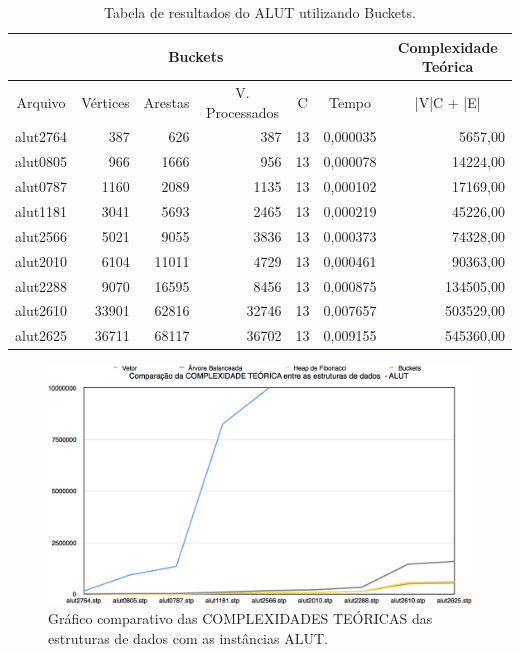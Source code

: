 \documentclass[
	12pt,				%
	oneside,			%
	a4paper,			%
	english,			%
	french,				%
	spanish,			%
	brazil,				%
	]{abntex2}
\begin{document}
\begin{table}[H]
  \centering    
  \begin{tabular}{|c|r|r|r|r|r|r|}
    \toprule
    \multicolumn{6}{|c|}{\cellcolor{gray!25}\textbf{Buckets}} & \multicolumn{1}{|c|}{\cellcolor{gray!25}\textbf{Complexidade Teórica}}\\
    \midrule
    \multicolumn{1}{|c|}{\cellcolor{gray!10}Arquivo} & \multicolumn{1}{|c|}{\cellcolor{gray!10}Vértices} & \multicolumn{1}{|c|}{\cellcolor{gray!10}Arestas} & \multicolumn{1}{|c|}{\cellcolor{gray!10}V. Processados} & \multicolumn{1}{|c|}{\cellcolor{gray!10}C} &
    \multicolumn{1}{|c|}{\cellcolor{gray!10}Tempo} & \multicolumn{1}{|c|}{\cellcolor{gray!10}|V|C + |E|}\\
    \hline
    alut2764 & 387 & 626 & 387 & 13 & 0,000035 & 5657,00 \\
    \hline
    alut0805 & 966 & 1666 & 956 & 13 & 0,000078 & 14224,00 \\
    \hline
    alut0787 & 1160 & 2089 & 1135 & 13 & 0,000102 & 17169,00 \\
    \hline
    alut1181 & 3041 & 5693 & 2465 & 13 & 0,000219 & 45226,00 \\
    \hline
    alut2566 & 5021 & 9055 & 3836 & 13 & 0,000373 & 74328,00 \\
    \hline
    alut2010 & 6104 & 11011 & 4729 & 13 & 0,000461 & 90363,00 \\
    \hline
    alut2288 & 9070 & 16595 & 8456 & 13 & 0,000875 & 134505,00 \\
    \hline
    alut2610 & 33901 & 62816 & 32746 & 13 & 0,007657 & 503529,00 \\
    \hline
    alut2625 & 36711 & 68117 & 36702 & 13 & 0,009155 & 545360,00 \\
    \hline
  \end{tabular}
  \caption{Tabela de resultados do ALUT utilizando Buckets.}  
  \label{tab:AlutBuckets}
\end{table}

\begin{figure}[!ht]
 \centering
 \includegraphics[width=6.4in]{charts/comp_teoria_alut.png}
 \caption{Gráfico comparativo das COMPLEXIDADES TEÓRICAS das estruturas de dados com as instâncias ALUT.}
 \label{fig:AlutGraphComplex}
\end{figure}
\end{document}
